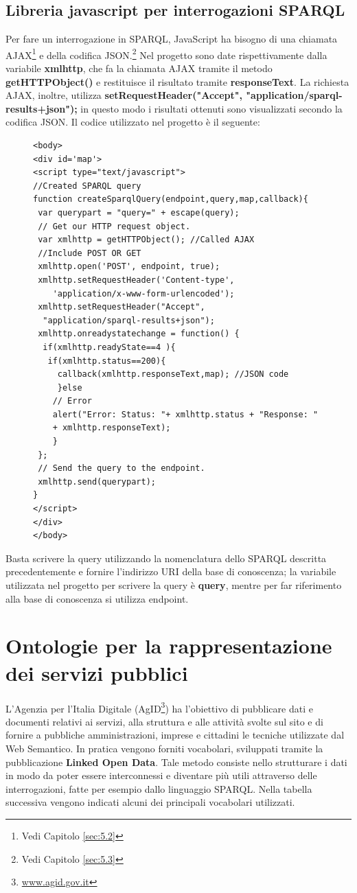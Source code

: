 \documentclass[a4paper,11pt]{article}
\begin{document}
\subsection{Libreria javascript per interrogazioni SPARQL}
\label{sec:4.2}
Per fare un interrogazione in SPARQL, JavaScript ha bisogno di una chiamata AJAX\footnote{Vedi Capitolo \ref{sec:5.2}} e della codifica JSON.\footnote{Vedi Capitolo \ref{sec:5.3}}
Nel progetto sono date rispettivamente dalla variabile \textbf{xmlhttp}, che fa la chiamata AJAX tramite il metodo \textbf{getHTTPObject()} e restituisce il risultato tramite \textbf{responseText}.
La richiesta AJAX, inoltre, utilizza \newline \textbf{setRequestHeader("Accept", "application/sparql-results+json");} \newline in questo modo i risultati ottenuti sono visualizzati secondo la codifica JSON.
Il codice utilizzato nel progetto è il seguente:
\begin{figure}[!htb]
\begin{lstlisting}[style=htmlcssjs]
<body>		
<div id='map'>
<script type="text/javascript">
//Created SPARQL query
function createSparqlQuery(endpoint,query,map,callback){	
 var querypart = "query=" + escape(query);
 // Get our HTTP request object.
 var xmlhttp = getHTTPObject(); //Called AJAX
 //Include POST OR GET
 xmlhttp.open('POST', endpoint, true); 
 xmlhttp.setRequestHeader('Content-type',
 	'application/x-www-form-urlencoded');
 xmlhttp.setRequestHeader("Accept", 
  "application/sparql-results+json");	
 xmlhttp.onreadystatechange = function() {
  if(xmlhttp.readyState==4 ){
   if(xmlhttp.status==200){				
	 callback(xmlhttp.responseText,map); //JSON code
	 }else
	// Error
	alert("Error: Status: "+ xmlhttp.status + "Response: "
	+ xmlhttp.responseText);
	}	
 };
 // Send the query to the endpoint.
 xmlhttp.send(querypart);	
}
</script>
</div>
</body>
\end{lstlisting}
\end{figure}\newline
Basta scrivere la query utilizzando la nomenclatura dello SPARQL descritta precedentemente e fornire l'indirizzo URI della base di conoscenza; la variabile utilizzata nel progetto per scrivere la query è \textbf{query}, mentre per far riferimento alla base di conoscenza si utilizza endpoint.
\newpage
\section{Ontologie per la rappresentazione dei servizi pubblici}
\label{sec:5}
L’Agenzia per l’Italia Digitale (AgID\footnote{\url{www.agid.gov.it}}) ha l'obiettivo di pubblicare dati e documenti relativi ai servizi, alla struttura e alle attività svolte sul sito e di fornire a pubbliche amministrazioni, imprese e cittadini le tecniche utilizzate dal Web Semantico. In pratica vengono forniti vocabolari, sviluppati tramite la pubblicazione \textbf{Linked Open Data}. Tale metodo consiste nello strutturare i dati in modo da poter essere interconnessi e diventare più utili attraverso delle interrogazioni, fatte per esempio dallo linguaggio SPARQL. 
Nella tabella successiva vengono indicati alcuni dei principali vocabolari utilizzati.
\end{document}
